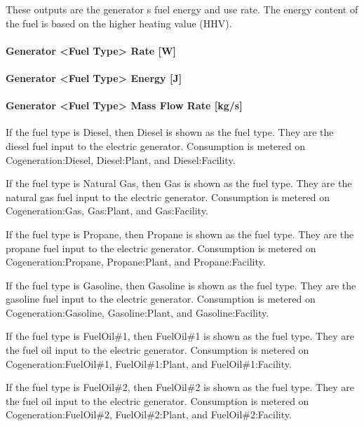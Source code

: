 These outputs are the generator s fuel energy and use rate. The energy content of the fuel is based on the higher heating value (HHV).

\paragraph{Generator \textless{}Fuel Type\textgreater{} Rate {[}W{]}}\label{generator-fuel-type-rate-w}

\paragraph{Generator \textless{}Fuel Type\textgreater{} Energy {[}J{]}}\label{generator-fuel-type-energy-j}

\paragraph{Generator \textless{}Fuel Type\textgreater{} Mass Flow Rate {[}kg/s{]}}\label{generator-fuel-type-mass-flow-rate-kgs}

If the fuel type is Diesel, then Diesel is shown as the fuel type. They are the diesel fuel input to the electric generator. Consumption is metered on Cogeneration:Diesel, Diesel:Plant, and Diesel:Facility.

If the fuel type is Natural Gas, then Gas is shown as the fuel type. They are the natural gas fuel input to the electric generator. Consumption is metered on Cogeneration:Gas, Gas:Plant, and Gas:Facility.

If the fuel type is Propane, then Propane is shown as the fuel type. They are the propane fuel input to the electric generator. Consumption is metered on Cogeneration:Propane, Propane:Plant, and Propane:Facility.

If the fuel type is Gasoline, then Gasoline is shown as the fuel type. They are the gasoline fuel input to the electric generator. Consumption is metered on Cogeneration:Gasoline, Gasoline:Plant, and Gasoline:Facility.

If the fuel type is FuelOil\#1, then FuelOil\#1 is shown as the fuel type. They are the fuel oil input to the electric generator. Consumption is metered on Cogeneration:FuelOil\#1, FuelOil\#1:Plant, and FuelOil\#1:Facility.

If the fuel type is FuelOil\#2, then FuelOil\#2 is shown as the fuel type. They are the fuel oil input to the electric generator. Consumption is metered on Cogeneration:FuelOil\#2, FuelOil\#2:Plant, and FuelOil\#2:Facility.

